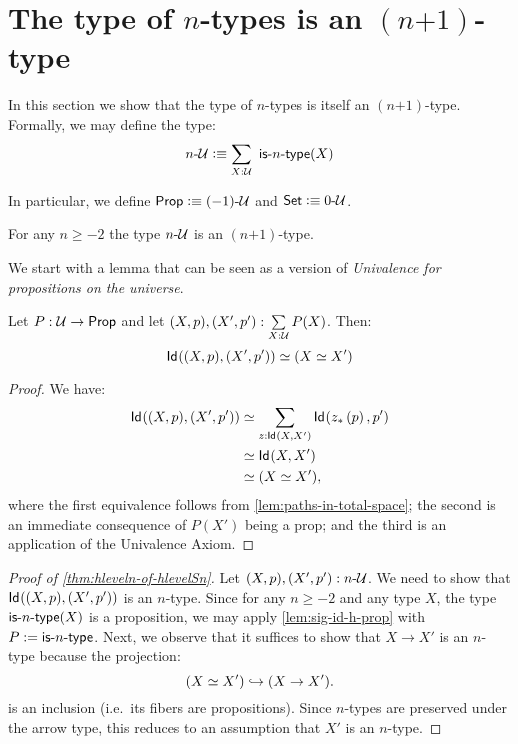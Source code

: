 \section{The type of $n$-types is an $(n\mbox{+}1)$-type}

In this section we show that the type of $n$-types is itself an $(n\mbox{+}1)$-type. Formally, we may define the type:
 \[n\mbox{-}\type \defeq \sum_{X : \type} \ \istype{n}(X) \]

In particular, we define $\mathsf{Prop} \vcentcolon\equiv (-1)\mbox{-}\mathcal{U}$ and $\mathsf{Set} \vcentcolon\equiv 0\mbox{-}\mathcal{U}$.

\begin{thm}\label{thm:hleveln-of-hlevelSn}
 For any $n \geq -2$ the type $n\mbox{-}\mathcal{U}$ is an $(n\mbox{+}1)$-type.
\end{thm}

We start with a lemma that can be seen as a version of {\em Univalence for propositions on the universe}.

\begin{lem}\label{lem:sig-id-h-prop}
 Let $P : \mathcal{U} \to \mathsf{Prop}$ and let $(X, p), (X', p') : \sum\limits_{X : \mathcal{U}} P(X)$. Then:
 \[ \mathsf{Id}_{}((X, p),(X', p'))  \simeq (X \simeq X')\]
\end{lem}

\begin{proof}
 We have:
 \begin{equation*}\begin{split}
 \mathsf{Id}_{}((X, p),(X', p')) & \simeq \sum_{z : \mathsf{Id}_{}(X,X')} \mathsf{Id}_{}({z}_{*}\left({p}\right),p') \\
  & \simeq \mathsf{Id}_{}(X,X') \\
  & \simeq (X \simeq X'),
 \end{split}
 \end{equation*}
 where the first equivalence follows from \ref{lem:paths-in-total-space}; the second is an immediate consequence of $P(X')$ being a prop; and the third is an application of the Univalence Axiom.
\end{proof}

\begin{proof}[Proof of \autoref{thm:hleveln-of-hlevelSn}]
 Let $(X, p), (X', p') : n\mbox{-}\mathcal{U}$. We need to show that $\mathsf{Id}_{}((X, p),(X', p'))$ is an $n$-type. Since for any $n \geq -2$ and any type $X$, the type $\mathsf{is}\mbox{-}{n}\mbox{-}\mathsf{type}(X)$ is a proposition, we may apply \autoref{lem:sig-id-h-prop} with $P := \mathsf{is}\mbox{-}{n}\mbox{-}\mathsf{type}$. Next, we observe that it
suffices to show that $X \rightarrow X'$ is an $n$-type because the projection:
 \[(X \simeq X') \hookrightarrow (X \rightarrow X').\]
 is an inclusion (i.e.~its fibers are propositions). Since $n$-types are preserved under the arrow type, this reduces to an assumption that $X'$ is an $n$-type.
\end{proof} 

